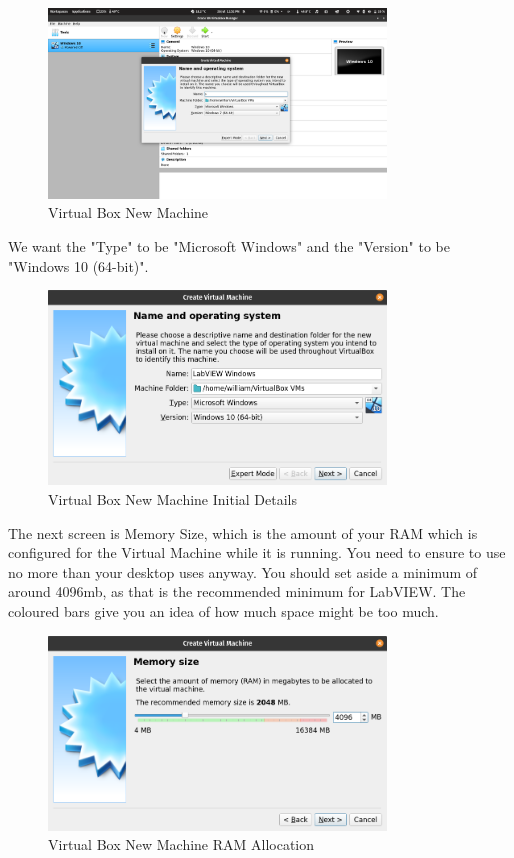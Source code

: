 \documentclass[a4paper,11pt]{report}
\begin{document}
\begin{figure}[H]
\centering
\includegraphics[width=0.8\textwidth]{screenshots/virtualboxsetup}
\caption{Virtual Box New Machine}
\end{figure}

We want the "Type" to be "Microsoft Windows" and the "Version" to be "Windows 10 (64-bit)".

\begin{figure}[H]
\centering
\includegraphics[width=0.8\textwidth]{screenshots/virtualboxsetupfilled}
\caption{Virtual Box New Machine Initial Details}
\end{figure}

The next screen is Memory Size, which is the amount of your RAM which is configured for the Virtual Machine while it is running. You need to ensure to use no more than your desktop uses anyway. You should set aside a minimum of around 4096mb, as that is the recommended minimum for LabVIEW. The coloured bars give you an idea of how much space might be too much.

\begin{figure}[H]
\centering
\includegraphics[width=0.8\textwidth]{screenshots/virtualboxram}
\caption{Virtual Box New Machine RAM Allocation}
\end{figure}
\end{document}
